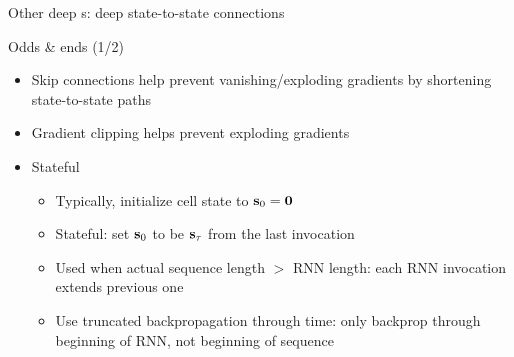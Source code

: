 \begin{frame}{Other deep \rnn{}s: deep state-to-state connections \citep{PascanuICLR14}}
    
    
\end{frame}

\begin{frame}{Odds \& ends (1/2)}
    \begin{itemize}
        \item<+-> Skip connections help prevent vanishing/exploding gradients by shortening state-to-state paths
        \item<+-> Gradient clipping helps prevent exploding gradients \citep{MikolovPhD12,PascanuICML13}
        \item<+-> Stateful \rnn{}
        \begin{itemize}[<.->]
            \item Typically, initialize cell state to $\mathbf{s}_0 = \mathbf{0}$
            \item<+-> Stateful: set $\mathbf{s}_0$ to be $\mathbf{s}_\tau$ from the last \rnn{} invocation
            \item Used when actual sequence length $>$ RNN length: each RNN invocation extends previous one
            \item Use truncated backpropagation through time: only backprop through beginning of RNN, not beginning of sequence
        \end{itemize}
    \end{itemize}

    
\end{frame}

